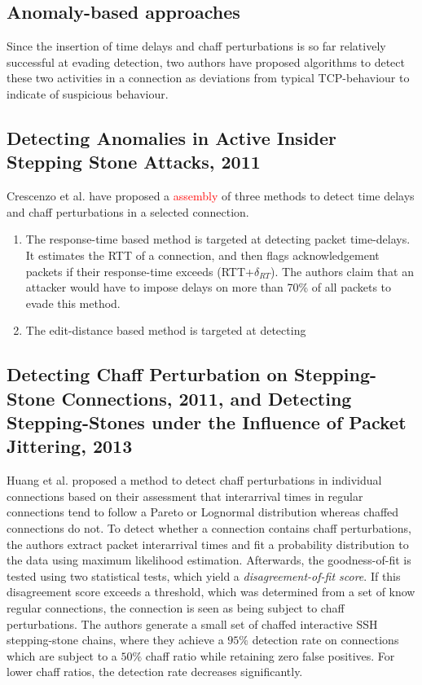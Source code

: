 \documentclass[runningheads]{llncs}\usepackage[]{graphicx}\usepackage[]{color}
\begin{document}





\subsection{Anomaly-based approaches}

Since the insertion of time delays and chaff perturbations is so far relatively successful at evading detection, two authors have proposed algorithms to detect these two activities in a connection as deviations from typical TCP-behaviour to indicate of suspicious behaviour. 

\subsection{Detecting Anomalies in Active Insider Stepping Stone Attacks, 2011}

Crescenzo et al. \cite{di2011detecting} have proposed a \textcolor{red}{assembly} of three methods to detect time delays and chaff perturbations in a selected connection. 
\begin{enumerate}
\item The response-time based method is targeted at detecting packet time-delays. It estimates the RTT of a connection, and then flags acknowledgement packets if their response-time exceeds (RTT+$\delta_{RT}$). The authors claim that an attacker would have to impose delays on more than 70\% of all packets to evade this method.
\item The edit-distance based method is targeted at detecting 
\end{enumerate}

\subsection{Detecting Chaff Perturbation on Stepping-Stone Connections, 2011, and Detecting Stepping-Stones under the  Influence of Packet Jittering, 2013}
Huang et al. \cite{huang2011detecting} proposed a method to detect chaff perturbations in individual connections based on their assessment that interarrival times in regular connections tend to follow a Pareto or Lognormal distribution whereas chaffed connections do not. To detect whether a connection contains chaff perturbations, the authors extract packet interarrival times and fit a probability distribution to the data using maximum likelihood estimation. Afterwards, the goodness-of-fit is tested using two statistical tests, which yield a \textit{disagreement-of-fit score}. If this disagreement score exceeds a threshold, which was determined from a set of know regular connections, the connection is seen as being subject to chaff perturbations. The authors generate a small set of chaffed interactive SSH stepping-stone chains, where they achieve a $95\%$ detection rate on connections which are subject to a $50\%$ chaff ratio while retaining zero false positives. For lower chaff ratios, the detection rate decreases significantly. 
\end{document}
